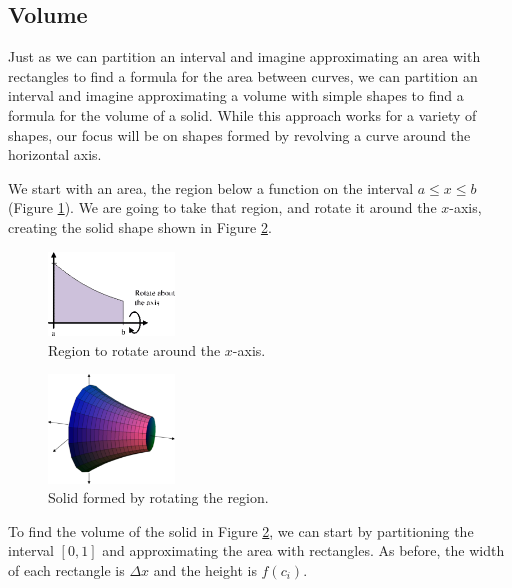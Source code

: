 \subsection{Volume}
Just as we can partition an interval and imagine approximating an area with rectangles to find a formula for the area between curves, we can partition an interval and imagine approximating a volume with simple shapes to find a formula for the volume of a solid. While this approach works for a variety of shapes, our focus will be on shapes formed by revolving a curve around the horizontal axis.

We start with an area, the region below a function on the interval $a\leq x\leq b$ (Figure \ref{fig:5-8-region}). We are going to take that region, and rotate it around the $x$-axis, creating the solid shape shown in Figure \ref{fig:5-8-solid}.

\begin{figure}[!ht]
  \centering
    \includegraphics[width=0.3\textwidth]{img/chap5/image070.png}
    \caption{Region to rotate around the $x$-axis.}
    \label{fig:5-8-region}
\end{figure}
\begin{figure}[!ht]
  \centering
    \includegraphics[width=0.3\textwidth]{img/chap5/image052.png}
    \caption{Solid formed by rotating the region.}
    \label{fig:5-8-solid}
\end{figure}
To find the volume of the solid in Figure \ref{fig:5-8-solid}, we can start by partitioning the interval $[0,1]$ and approximating the area with rectangles. As before, the width of each rectangle is $\Delta x$ and the height is $f(c_i)$.

